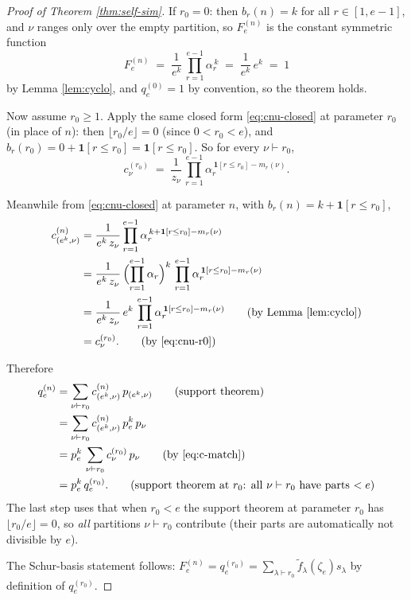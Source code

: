 \documentclass[11pt]{article}
\theoremstyle{remark}
\newcommand{\ftilde}{\widetilde{f}}
\newcommand{\qe}{q_e}
\newcommand{\zetae}{\zeta_e}
\newcommand{\one}{\mathbf{1}}
\begin{document}
\begin{proof}[Proof of Theorem \ref{thm:self-sim}]
If $r_0 = 0$: then $b_r(n) = k$ for all $r \in [1, e-1]$, and $\nu$ ranges only over the empty partition, so $F_e^{(n)}$ is the constant symmetric function
\[
  F_e^{(n)} \;=\; \frac{1}{e^k}\, \prod_{r=1}^{e-1} \alpha_r^{\,k} \;=\; \frac{1}{e^k}\, e^k \;=\; 1
\]
by Lemma \ref{lem:cyclo}, and $\qe^{(0)} = 1$ by convention, so the theorem holds.

Now assume $r_0 \ge 1$. Apply the same closed form \eqref{eq:cnu-closed} at parameter $r_0$ (in place of $n$): then $\lfloor r_0/e\rfloor = 0$ (since $0 < r_0 < e$), and $b_r(r_0) = 0 + \one[r \le r_0] = \one[r \le r_0]$. So for every $\nu \vdash r_0$,
\begin{equation}\label{eq:cnu-r0}
  c_\nu^{(r_0)} \;=\; \frac{1}{z_\nu}\, \prod_{r=1}^{e-1} \alpha_r^{\,\one[r \le r_0] - m_r(\nu)}.
\end{equation}

Meanwhile from \eqref{eq:cnu-closed} at parameter $n$, with $b_r(n) = k + \one[r \le r_0]$,
\begin{align}
  c_{(e^k, \nu)}^{(n)}
  &= \frac{1}{e^k\, z_\nu} \prod_{r=1}^{e-1} \alpha_r^{\,k + \one[r \le r_0] - m_r(\nu)} \notag \\
  &= \frac{1}{e^k\, z_\nu}\, \Bigl(\prod_{r=1}^{e-1} \alpha_r\Bigr)^{k}\, \prod_{r=1}^{e-1} \alpha_r^{\,\one[r \le r_0] - m_r(\nu)} \notag \\
  &= \frac{1}{e^k\, z_\nu}\, e^{k}\, \prod_{r=1}^{e-1} \alpha_r^{\,\one[r \le r_0] - m_r(\nu)} \tag{by Lemma \ref{lem:cyclo}} \\
  &= c_\nu^{(r_0)}. \tag{by \eqref{eq:cnu-r0}} \label{eq:c-match}
\end{align}

Therefore
\begin{align*}
  \qe^{(n)}
  &= \sum_{\nu \vdash r_0} c_{(e^k, \nu)}^{(n)}\, p_{(e^k, \nu)} \tag{support theorem} \\
  &= \sum_{\nu \vdash r_0} c_{(e^k, \nu)}^{(n)}\, p_e^{k}\, p_\nu \\
  &= p_e^{k}\, \sum_{\nu \vdash r_0} c_\nu^{(r_0)}\, p_\nu \tag{by \eqref{eq:c-match}} \\
  &= p_e^{k}\, \qe^{(r_0)}. \tag{support theorem at $r_0$: all $\nu \vdash r_0$ have parts $< e$}
\end{align*}
The last step uses that when $r_0 < e$ the support theorem at parameter $r_0$ has $\lfloor r_0/e\rfloor = 0$, so \emph{all} partitions $\nu \vdash r_0$ contribute (their parts are automatically not divisible by $e$).

The Schur-basis statement follows: $F_e^{(n)} = \qe^{(r_0)} = \sum_{\lambda \vdash r_0} \ftilde_\lambda(\zetae) s_\lambda$ by definition of $\qe^{(r_0)}$.
\end{proof}
\end{document}

